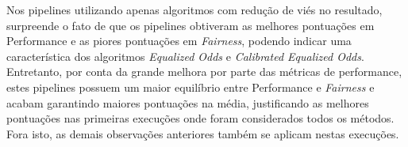 \documentclass[portugues]{ic-tese}
\begin{document}
Nos pipelines utilizando apenas algoritmos com redução de viés no resultado, surpreende o fato de que os pipelines obtiveram as melhores pontuações em Performance e as piores pontuações em \textit{Fairness}, podendo indicar uma característica dos algoritmos \textit{Equalized Odds} e \textit{Calibrated Equalized Odds}. Entretanto, por conta da grande melhora por parte das métricas de performance, estes pipelines possuem um maior equilíbrio entre Performance e \textit{Fairness} e acabam garantindo maiores pontuações na média, justificando as melhores pontuações nas primeiras execuções onde foram considerados todos os métodos. Fora isto, as demais observações anteriores também se aplicam nestas execuções.

\begin{table}[H]
\begin{center}
  \caption{Melhores opções escolhidas pelo modelo MAPE-K \\ Apenas sem redução de viés - 50\% Performance/50\% Fairness}
\label{tbl:ScoreMAPEKNoproc5050}
\end{center}
\end{table}
\end{document}
